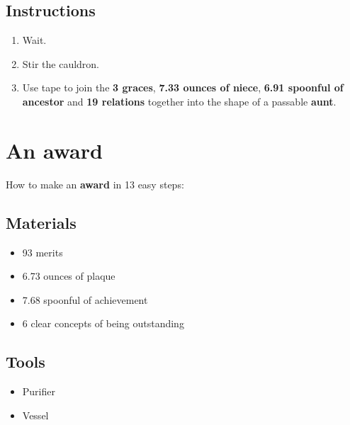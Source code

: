 \documentclass{article}
\begin{document}
\subsection{Instructions}\begin{enumerate}
\item 
Wait.
\item 
Stir the cauldron.
\item 
Use tape to join the \textbf{3 graces}, \textbf{7.33 ounces of niece}, \textbf{6.91 spoonful of ancestor} and \textbf{19 relations} together into the shape of a passable \textbf{aunt}.
\end{enumerate}
\newpage
\section{An award}How to make an \textbf{award} in 13 easy steps:

\subsection{Materials}\begin{itemize}
\item 
93 merits
\item 
6.73 ounces of plaque
\item 
7.68 spoonful of achievement
\item 
6 clear concepts of being outstanding
\end{itemize}
\subsection{Tools}\begin{itemize}
\item 
Purifier
\item 
Vessel
\end{itemize}
\end{document}
